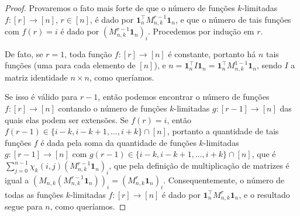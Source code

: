 
\begin{theorem} \label{th:matrix-form-n-to-n}
\end{theorem}
\begin{proof}
  Provaremos o fato mais forte de que o número de funções $k$-limitadas $f \colon [r] \to [n]$, $r \in [n]$, é dado por $\mathbf{1}_n^\intercal M_{n,k}^{r - 1} \mathbf{1}_n$, e que o número de tais funções com $f(r) = i$ é dado por $(M_{n,k}^{r - 1} \mathbf{1}_n)_i$. Procedemos por indução em $r$.

  De fato, se $r = 1$, toda função $f \colon [r] \to [n]$ é constante, portanto há $n$ tais funções (uma para cada elemento de $[n]$), e $n = \mathbf{1}_n^\intercal I \mathbf{1}_n = \mathbf{1}_n^\intercal M_{n,k}^{1 - 1} \mathbf{1}_n$, sendo $I$ a matriz identidade $n \times n$, como queríamos.

  Se isso é válido para $r - 1$, então podemos encontrar o número de funções $f \colon [r] \to [n]$ contando o número de funções $k$-limitadas $g \colon [r-1] \to [n]$ das quais elas podem ser extensões. Se $f(r) = i$, então $f(r - 1) \in \{i - k, i - k + 1, \dots, i + k\} \cap [n]$, portanto a quantidade de tais funções $f$ é dada pela soma da quantidade de funções $k$-limitadas $g \colon [r-1] \to [n]$ com $g(r-1) \in \{i - k, i - k + 1, \dots, i + k\} \cap [n]$, que é $\sum_{j = 0}^{n-1} \chi_k(i, j) (M_{n,k}^{r-1} \mathbf{1}_n)_i$, que pela definição de multiplicação de matrizes é igual a $(M_{n,k} (M_{n,k}^{r-1} \mathbf{1}_n))_i = (M_{n,k}^r \mathbf{1}_n)_i$. Consequentemente, o número de todas as funções $k$-limitadas $f \colon [r] \to [n]$ é dado por $\mathbf{1}_n^\intercal M_{n,k}^r \mathbf{1}_n$, e o resultado segue para $n$, como queríamos.
\end{proof}

